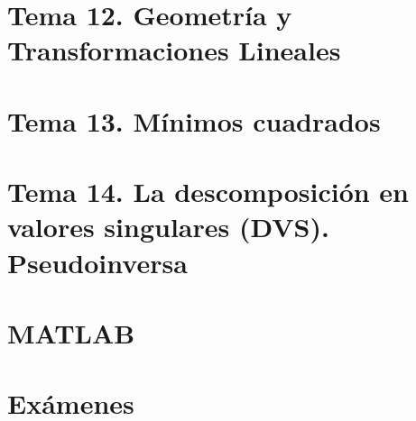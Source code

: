 \documentclass[12pt]{report} %
\begin{document}
\part{Tema 12. Geometría y Transformaciones Lineales}




\part{Tema 13. Mínimos cuadrados}





\part{Tema 14. La descomposición en valores singulares (DVS). Pseudoinversa}





\part{MATLAB}




\part{Exámenes}














\end{document}
